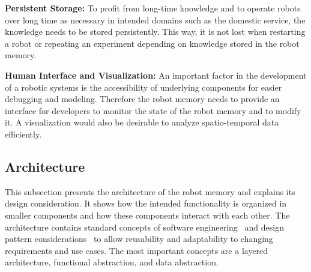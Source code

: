 \documentclass[a4paper,11pt]{article}
\begin{document}
\smallskip
\textbf{Persistent Storage:} To profit from long-time knowledge and to
operate robots over long time as necessary in intended domains
such as the domestic service, the knowledge needs to be stored
persistently. This way, it is not lost when restarting a robot or
repeating an experiment depending on knowledge stored in the robot
memory.

\smallskip
\textbf{Human Interface and Visualization:} An important factor in the
development of a robotic systems is the accessibility of underlying
components for easier debugging and modeling. Therefore the robot
memory needs to provide an interface for developers to monitor the
state of the robot memory and to modify it. A visualization would also
be desirable to analyze spatio-temporal data efficiently.


\subsection{Architecture}
\label{sec:arch}
This subsection presents the architecture of the robot memory and
explains its design consideration. It shows how the intended
functionality is organized in smaller components and how these
components interact with each other. The architecture
contains standard concepts of software
engineering~\cite{software-architecture} and design pattern
considerations~\cite{design-patterns} to allow reusability and
adaptability to changing requirements and use cases. The most
important concepts are a layered architecture, functional abstraction,
and data abstraction.
\end{document}
